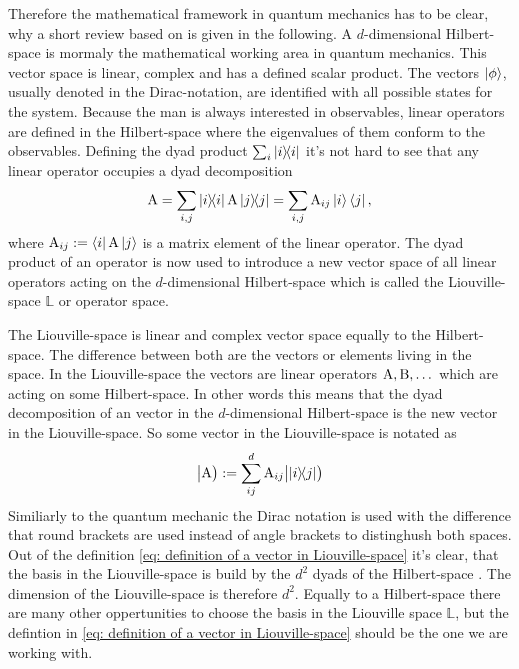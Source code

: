 Therefore the mathematical framework in quantum mechanics has to be clear, why a short review based on \cite{Audretsch} is given in the following.
A $d$-dimensional Hilbert-space is mormaly the mathematical working area in quantum mechanics.
This vector space is linear, complex and has a defined scalar product.
The vectors $\ket{\phi}$, usually denoted in the Dirac-notation, are identified with all possible states for the system.
Because the man is always interested in observables, linear operators are defined in the Hilbert-space where the eigenvalues of them conform to the observables.
Defining the dyad product $\sum_{i} \dyad{i}{i}$ it's not hard to see that any linear operator occupies a dyad decomposition
%
\begin{align}
	\mt{A} = \sum\limits_{i,j} \dyad{i}{i} \mt{A} \dyad{j}{j} = \sum\limits_{i,j} \mt{A}_{ij} \ket{i} \bra{j},
	\label{eq: dyad product}
\end{align}
%
where $\mt{A}_{ij} := \bra{i}\mt{A}\ket{j}$ is a matrix element of the linear operator.
The dyad product of an operator is now used to introduce a new vector space of all linear operators acting on the $d$-dimensional Hilbert-space which is called the Liouville-space $\mathbb{L}$ or operator space.

The Liouville-space is linear and complex vector space equally to the Hilbert-space.
The difference between both are the vectors or elements living in the space.
In the Liouville-space the vectors are linear operators $\mathrm{A}, \mathrm{B}, \dots$ which are acting on some Hilbert-space.
In other words this means that the dyad decomposition of an vector in the $d$-dimensional Hilbert-space is the new vector in the Liouville-space.
So some vector in the Liouville-space is notated as
%
\begin{align}
	\oket{\mt{A}} := \sum\limits_{ij}^{d} \mt{A}_{ij} \oket{\dyad{i}{j}}
	\label{eq: definition of a vector in Liouville-space}
\end{align}
%
Similiarly to the quantum mechanic the Dirac notation is used with the difference that round brackets are used instead of angle brackets to distinghush both spaces.
Out of the definition \eqref{eq: definition of a vector in Liouville-space} it's clear, that the basis in the Liouville-space is build by the $d^{2}$ dyads of the Hilbert-space .
The dimension of the Liouville-space is therefore $d^{2}$.
Equally to a Hilbert-space there are many other oppertunities to choose the basis in the Liouville space $\mathbb{L}$, but the defintion in \eqref{eq: definition of a vector in Liouville-space} should be the one we are working with.

